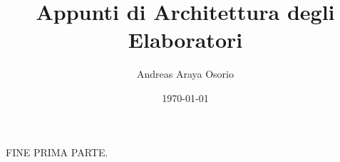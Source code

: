 \documentclass[11pt, a4paper]{report}
\title{Appunti di Architettura degli Elaboratori}
\author{Andreas Araya Osorio}
\date{\today}
\begin{document}
\maketitle

\tableofcontents



{\Huge FINE PRIMA PARTE.}


\end{document}
